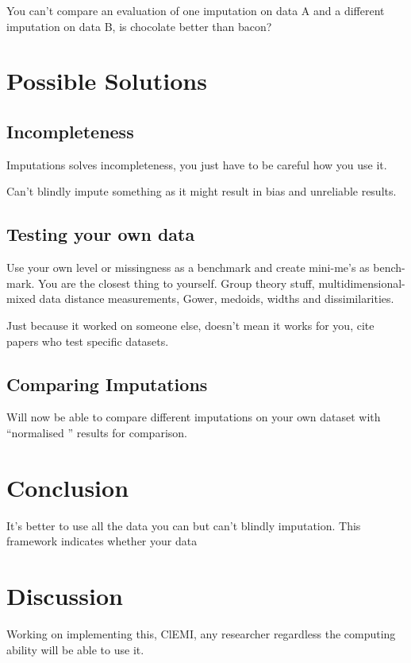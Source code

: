 \documentclass{article}
\begin{document}
		You can't compare an evaluation of one imputation on data A and a different imputation on data B, is chocolate better than bacon? 

	\section{Possible Solutions} %
	\label{sec:a_solution}
		\subsection{Incompleteness} %
		\label{sub:incompleteness}
		Imputations solves incompleteness, you just have to be careful how you use it. 

		Can't blindly impute something as it might result in bias and unreliable results. 
		\subsection{Testing your own data} %
		\label{sub:testing_your_own_data}
		Use your own level or missingness as a benchmark and create mini-me's as bench-mark. You are the closest thing to yourself. 
		Group theory stuff, multidimensional-mixed data distance measurements, Gower, medoids, widths and dissimilarities.

		Just because it worked on someone else, doesn't mean it works for you, cite papers who test specific datasets. 
		\subsection{Comparing Imputations} %
		\label{sub:comparing_imputations}
		Will now be able to compare different imputations on your own dataset with ``normalised '' results for comparison. 

	\section{Conclusion} %
	\label{sec:conclusion}
	It's better to use all the data you can but can't blindly imputation. This framework indicates whether your data 

	\section{Discussion} %
	\label{sec:discussion}
	Working on implementing this, ClEMI, any researcher regardless the computing ability will be able to use it. 
\end{document}

